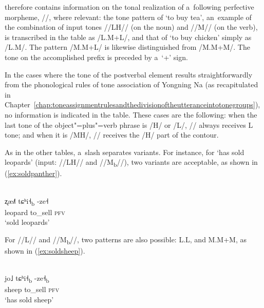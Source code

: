 \largerpage
{} therefore contains information on the tonal
realization of a~following {perfective} morpheme, //, where relevant: the tone pattern of
‘to buy tea’, an~example of the combination of input tones \mbox{//LH//} (on the noun) and \mbox{//M//} (on the verb), is
transcribed in the table as /L.M+L/, and that of ‘to buy chicken’ simply as /L.M/. The pattern /M.M+L/ is
likewise distinguished from /M.M+M/. The tone on the {accomplished} prefix is preceded by a~‘+’ sign.

In the cases where the tone of the postverbal element results straightforwardly from the
phonological rules of tone association of Yongning Na (as recapitulated in Chapter~\ref{chap:toneassignmentrulesandthedivisionoftheutteranceintotonegroups}), no information is
indicated in the table. These cases are the following: when the last tone of the object"=plus"=verb phrase
is /H/ or /L/, // always receives L tone; and when it is /MH/,
// receives the /H/ part of the contour.

As in the other tables, a~slash separates variants. For instance, for ‘has sold
leopards’ (input: \mbox{//LH//} and \mbox{//M\textsubscript{b}//}), two variants are acceptable, as shown in (\ref{ex:soldpanther}).

\begin{exe}
	\ex
	\label{ex:soldpanther}
	\\
	\gll ʐæ˩˥ tɕʰi˧\textsubscript{b}		-ze˧\\
	leopard		to\_sell		\textsc{pfv}\\
	\glt ‘sold leopards’
\end{exe}

For //L// and \mbox{//M\textsubscript{b}//}, two patterns are also possible: L.L, and M.M+M, as shown in (\ref{ex:soldsheep}).

\begin{exe}
	\ex
	\label{ex:soldsheep}
	\\
	\gll jo˩ tɕʰi˧\textsubscript{b}		-ze˧\textsubscript{b}\\
	sheep		to\_sell		\textsc{pfv}\\
	\glt ‘has sold sheep’
\end{exe}

